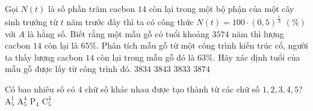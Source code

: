 \begin{ex}%
Gọi $N(t)$ là số phần trăm cacbon $14$ còn lại trong một bộ phận của một cây sinh trưởng từ $t$ năm trước đây thì ta có công thức $N(t)=100\cdot (0{,}5)^{\tfrac{t}{A}}\,\, (\%)$ với $A$ là hằng số. Biết rằng một mẫu gỗ có tuổi
khoảng $3574$ năm thì lượng cacbon $14$ còn lại là $65\%.$  Phân tích mẫu gỗ từ một công trình kiến trúc cổ,
người ta thấy lượng cacbon $14$ còn lại trong mẫu gỗ đó là $63\%.$ Hãy xác định tuổi của mẫu gỗ được lấy
từ công trình đó.
\choice
{$3834$}
{$3843$}
{\True $3833$}
{$3874$}
\end{ex}

\begin{ex}%
Có bao nhiêu số có $4$ chữ số khác nhau được tạo thành từ các chữ số $1,2,3,4,5$?
\choice
{$\mathrm{A}_5^1$}
{\True $\mathrm{A}_5^4$}
{$\mathrm{P}_4$}
{$\mathrm{C}_5^4$}
\end{ex}


